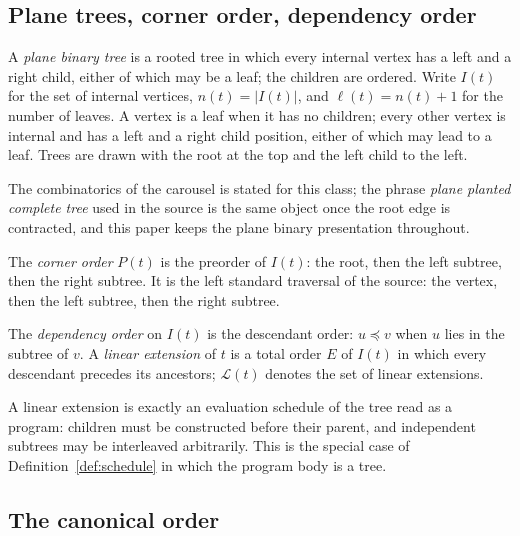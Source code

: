 
\subsection{Plane trees, corner order, dependency order}

\begin{definition}\label{def:plane-binary}
A \emph{plane binary tree} is a rooted tree in which every internal vertex has a left
and a right child, either of which may be a leaf; the children are ordered.  Write
$I(t)$ for the set of internal vertices, $n(t)=|I(t)|$, and
$\ell(t)=n(t)+1$ for the number of leaves.  A vertex is a leaf when
it has no children; every other vertex is internal and has a left and a right child
position, either of which may lead to a leaf.  Trees are drawn with the root at the top and the left
child to the left.
\end{definition}

The combinatorics of the carousel is stated for this class; the phrase \emph{plane
planted complete tree} used in the source is the same object once the root edge is
contracted, and this paper keeps the plane binary presentation throughout.

\begin{definition}\label{def:corner-order}
The \emph{corner order} $P(t)$ is the preorder of $I(t)$: the root, then the left
subtree, then the right subtree.  It is the left standard traversal of the source: the
vertex, then the left subtree, then the right subtree.
\end{definition}

\begin{definition}\label{def:dependency-order}
The \emph{dependency order} on $I(t)$ is the descendant order: $u\preceq v$ when $u$
lies in the subtree of $v$.  A \emph{linear extension} of $t$ is a total order $E$ of
$I(t)$ in which every descendant precedes its ancestors; $\mathcal{L}(t)$ denotes the
set of linear extensions.
\end{definition}

A linear extension is exactly an evaluation schedule of the tree read as a program:
children must be constructed before their parent, and independent subtrees may be
interleaved arbitrarily.  This is the special case of Definition~\ref{def:schedule}
in which the program body is a tree.

\subsection{The canonical order}

